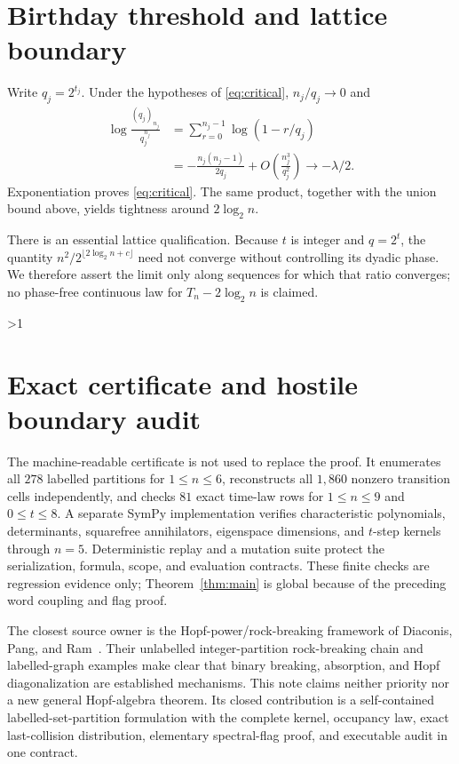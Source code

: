 \documentclass[10pt]{article}
\providecommand{\CRevisionRound}{2}
\newcommand{\fall}[2]{(#1)_{#2}}
\begin{document}
\section{Birthday threshold and lattice boundary}

Write $q_j=2^{t_j}$.  Under the hypotheses of \eqref{eq:critical},
$n_j/q_j\to0$ and
\begin{align*}
 \log\frac{\fall {q_j}{n_j}}{q_j^{n_j}}
 &=\sum_{r=0}^{n_j-1}\log(1-r/q_j)\\
 &=-\frac{n_j(n_j-1)}{2q_j}
   +O\!\left(\frac{n_j^3}{q_j^2}\right)
 \longrightarrow-\lambda/2.
\end{align*}
Exponentiation proves \eqref{eq:critical}.  The same product, together with
the union bound above, yields tightness around $2\log_2n$.

There is an essential lattice qualification.  Because $t$ is integer and
$q=2^t$, the quantity $n^2/2^{\lfloor2\log_2n+c\rfloor}$ need not converge
without controlling its dyadic phase.  We therefore assert the limit only
along sequences for which that ratio converges; no phase-free continuous law
for $T_n-2\log_2n$ is claimed.
\fi

\ifnum\CRevisionRound>1
\section{Exact certificate and hostile boundary audit}

The machine-readable certificate is not used to replace the proof.  It
enumerates all $278$ labelled partitions for $1\leq n\leq6$, reconstructs
all $1{,}860$ nonzero transition cells independently, and checks $81$ exact
time-law rows for $1\leq n\leq9$ and $0\leq t\leq8$.  A separate SymPy
implementation verifies characteristic polynomials, determinants,
squarefree annihilators, eigenspace dimensions, and $t$-step kernels through
$n=5$.  Deterministic replay and a mutation suite protect the serialization,
formula, scope, and evaluation contracts.  These finite checks are regression
evidence only; Theorem~\ref{thm:main} is global because of the preceding
word coupling and flag proof.

The closest source owner is the Hopf-power/rock-breaking framework of
Diaconis, Pang, and Ram~\cite{DPR}.  Their unlabelled integer-partition
rock-breaking chain and labelled-graph examples make clear that binary
breaking, absorption, and Hopf diagonalization are established mechanisms.
This note claims neither priority nor a new general Hopf-algebra theorem.  Its
closed contribution is a self-contained labelled-set-partition formulation
with the complete kernel, occupancy law, exact last-collision distribution,
elementary spectral-flag proof, and executable audit in one contract.
\end{document}
